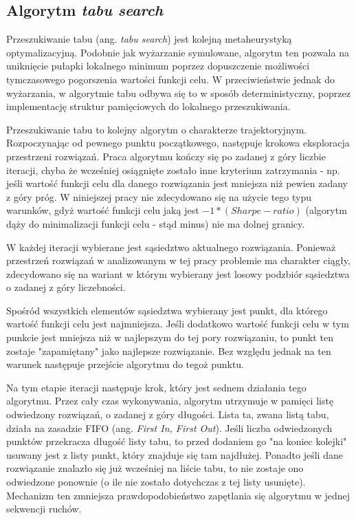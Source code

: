 \documentclass[12pt,a4paper,twoside,openany]{book}
\begin{document}
\subsection{Algorytm \textit{tabu search}}

Przeszukiwanie tabu (ang. \textit{tabu search}) jest kolejną metaheurystyką optymalizacyjną.
Podobnie jak wyżarzanie symulowane, algorytm ten pozwala na uniknięcie pułapki lokalnego minimum poprzez dopuszczenie możliwości tymczasowego pogorszenia wartości funkcji celu.
W przeciwieństwie jednak do wyżarzania, w algorytmie tabu odbywa się to w sposób deterministyczny, poprzez implementację struktur pamięciowych do lokalnego przeszukiwania.

Przeszukiwanie tabu to kolejny algorytm o charakterze trajektoryjnym.
Rozpoczynając od pewnego punktu początkowego, następuje krokowa eksploracja przestrzeni rozwiązań.
Praca algorytmu kończy się po zadanej z góry liczbie iteracji, chyba że wcześniej osiągnięte zostało inne kryterium zatrzymania - np. jeśli wartość funkcji celu dla danego rozwiązania jest mniejsza niż pewien zadany z góry próg.
W niniejszej pracy nie zdecydowano się na użycie tego typu warunków, gdyż wartość funkcji celu jaką jest $-1*(Sharpe-ratio)$ (algorytm dąży do minimalizacji funkcji celu - stąd minus) nie ma dolnej granicy.

W każdej iteracji wybierane jest sąsiedztwo aktualnego rozwiązania.
Ponieważ przestrzeń rozwiązań w analizowanym w tej pracy problemie ma charakter ciągły, zdecydowano się na wariant w którym wybierany jest losowy podzbiór sąsiedztwa o zadanej z góry liczebności.

Spośród wszystkich elementów sąsiedztwa wybierany jest punkt, dla którego wartość funkcji celu jest najmniejsza.
Jeśli dodatkowo wartość funkcji celu w tym punkcie jest mniejsza niż w najlepszym do tej pory rozwiązaniu, to punkt ten zostaje "zapamiętany" jako najlepsze rozwiązanie.
Bez względu jednak na ten warunek następuje przejście algorytmu do tegoż punktu.

Na tym etapie iteracji następuje krok, który jest sednem działania tego algorytmu.
Przez cały czas wykonywania, algorytm utrzymuje w pamięci listę odwiedzony rozwiązań, o zadanej z góry długości.
Lista ta, zwana listą tabu, działa na zasadzie FIFO (ang. \textit{First In, First Out}).
Jeśli liczba odwiedzonych punktów przekracza długość listy tabu, to przed dodaniem go "na koniec kolejki" usuwany jest z listy punkt, który znajduje się tam najdłużej. 
Ponadto jeśli dane rozwiązanie znalazło się już wcześniej na liście tabu, to nie zostaje ono odwiedzone ponownie (o ile nie zostało dotychczas z tej listy usunięte).
Mechanizm ten zmniejsza prawdopodobieństwo zapętlania się algorytmu w jednej sekwencji ruchów.
\end{document}
